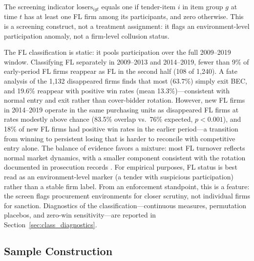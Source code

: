 The screening indicator $\text{losers}_{igt}$ equals one if tender-item
$i$ in item group $g$ at time $t$ has at least one FL firm among its
participants, and zero otherwise. This is a screening construct, not
a treatment assignment: it flags an environment-level participation
anomaly, not a firm-level collusion status.

The FL classification is static: it pools participation over the full
2009--2019 window. Classifying FL separately in 2009--2013 and
2014--2019, fewer than 9\% of early-period FL firms reappear as FL in the
second half (108 of 1,240). A fate analysis of the 1,132
disappeared firms finds that most (63.7\%) simply exit BEC, and
19.6\% reappear with positive win rates (mean 13.3\%)---consistent
with normal entry and exit rather than cover-bidder rotation.
However, new FL firms in 2014--2019 operate in the same purchasing
units as disappeared FL firms at rates modestly above chance
(83.5\% overlap vs.\ 76\% expected, $p < 0.001$), and 18\% of new
FL firms had positive win rates in the earlier period---a transition
from winning to persistent losing that is harder to reconcile with
competitive entry alone. The balance of evidence favors a
mixture: most FL turnover reflects normal market dynamics, with a
smaller component consistent with the rotation documented in
prosecution records \citep{marshall2012economics}. For empirical
purposes, FL status is best read as an environment-level marker (a
tender with suspicious participation) rather than a stable firm
label. From an enforcement standpoint, this is a feature: the screen
flags procurement environments for closer scrutiny, not individual
firms for sanction.
Diagnostics of the classification---continuous measures, permutation
placebos, and zero-win sensitivity---are reported in
Section~\ref{sec:class_diagnostics}.

\subsection{Sample Construction}
\label{sec:sample}

